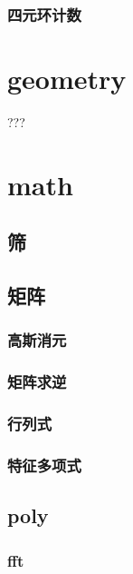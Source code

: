 \documentclass[12pt]{ctexart}
\begin{document}
\subsubsection{四元环计数}



\newpage

\section{geometry}

???

\newpage

\section{math}

\subsection{筛}

\subsection{矩阵}

\subsubsection{高斯消元}

\subsubsection{矩阵求逆}

\subsubsection{行列式}

\subsubsection{特征多项式}

\subsection{poly}

\subsubsection{fft}
\end{document}
